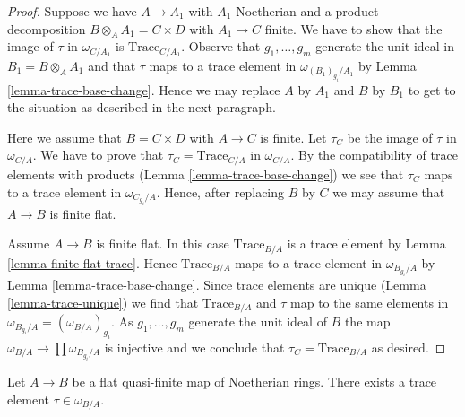 \begin{proof}
Suppose we have $A \to A_1$ with $A_1$ Noetherian and a product
decomposition $B \otimes_A A_1 = C \times D$ with $A_1 \to C$ finite.
We have to show that the image of $\tau$ in $\omega_{C/A_1}$ is
$\text{Trace}_{C/A_1}$. Observe that $g_1, \ldots, g_m$
generate the unit ideal in $B_1 = B \otimes_A A_1$ and that
$\tau$ maps to a trace element in $\omega_{(B_1)_{g_i}/A_1}$
by Lemma \ref{lemma-trace-base-change}. Hence we may replace
$A$ by $A_1$ and $B$ by $B_1$ to get to the situation as described
in the next paragraph.

\medskip\noindent
Here we assume that $B = C \times D$ with $A \to C$ is finite.
Let $\tau_C$ be the image of $\tau$ in $\omega_{C/A}$.
We have to prove that $\tau_C = \text{Trace}_{C/A}$ in $\omega_{C/A}$.
By the compatibility of trace elements with products
(Lemma \ref{lemma-trace-base-change})
we see that $\tau_C$ maps to a trace element in $\omega_{C_{g_i}/A}$.
Hence, after replacing $B$ by $C$ we may assume that $A \to B$
is finite flat.

\medskip\noindent
Assume $A \to B$ is finite flat. In this case $\text{Trace}_{B/A}$
is a trace element by Lemma \ref{lemma-finite-flat-trace}.
Hence $\text{Trace}_{B/A}$ maps to a trace element in
$\omega_{B_{g_i}/A}$ by Lemma \ref{lemma-trace-base-change}.
Since trace elements are unique (Lemma \ref{lemma-trace-unique})
we find that $\text{Trace}_{B/A}$ and $\tau$ map
to the same elements in $\omega_{B_{g_i}/A} = (\omega_{B/A})_{g_i}$.
As $g_1, \ldots, g_m$ generate the unit ideal of $B$ the map
$\omega_{B/A} \to \prod \omega_{B_{g_i}/A}$ is injective
and we conclude that $\tau_C = \text{Trace}_{B/A}$ as desired.
\end{proof}

\begin{lemma}
\label{lemma-dualizing-tau}
Let $A \to B$ be a flat quasi-finite map of Noetherian rings.
There exists a trace element $\tau \in \omega_{B/A}$.
\end{lemma}

